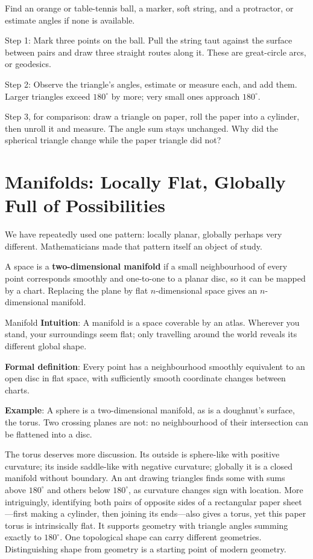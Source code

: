 \begin{shiyan}
Find an orange or table-tennis ball, a marker, soft string, and a protractor, or estimate angles if none is available.

Step 1: Mark three points on the ball. Pull the string taut against the surface between pairs and draw three straight routes along it. These are great-circle arcs, or geodesics.

Step 2: Observe the triangle's angles, estimate or measure each, and add them. Larger triangles exceed $180^\circ$ by more; very small ones approach $180^\circ$.

Step 3, for comparison: draw a triangle on paper, roll the paper into a cylinder, then unroll it and measure. The angle sum stays unchanged. Why did the spherical triangle change while the paper triangle did not?
\end{shiyan}

\section{Manifolds: Locally Flat, Globally Full of Possibilities}

We have repeatedly used one pattern: locally planar, globally perhaps very different. Mathematicians made that pattern itself an object of study.

\begin{dingyi}
A space is a \textbf{two-dimensional manifold} if a small neighbourhood of every point corresponds smoothly and one-to-one to a planar disc, so it can be mapped by a chart. Replacing the plane by flat $n$-dimensional space gives an $n$-dimensional manifold.
\end{dingyi}

\begin{shuyu}{Manifold}
\textbf{Intuition}: A manifold is a space coverable by an atlas. Wherever you stand, your surroundings seem flat; only travelling around the world reveals its different global shape.

\textbf{Formal definition}: Every point has a neighbourhood smoothly equivalent to an open disc in flat space, with sufficiently smooth coordinate changes between charts.

\textbf{Example}: A sphere is a two-dimensional manifold, as is a doughnut's surface, the torus. Two crossing planes are not: no neighbourhood of their intersection can be flattened into a disc.
\end{shuyu}

The torus deserves more discussion. Its outside is sphere-like with positive curvature; its inside saddle-like with negative curvature; globally it is a closed manifold without boundary. An ant drawing triangles finds some with sums above $180^\circ$ and others below $180^\circ$, as curvature changes sign with location. More intriguingly, identifying both pairs of opposite sides of a rectangular paper sheet---first making a cylinder, then joining its ends---also gives a torus, yet this paper torus is intrinsically flat. It supports geometry with triangle angles summing exactly to $180^\circ$. One topological shape can carry different geometries. Distinguishing shape from geometry is a starting point of modern geometry.

